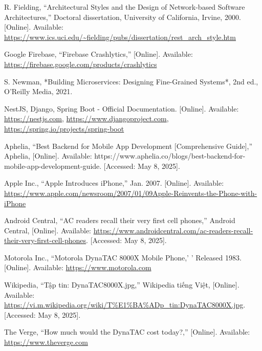 \documentclass[12pt]{report}
\begin{document}
\begin{thebibliography}{1}



  R. Fielding, “Architectural Styles and the Design of Network-based Software Architectures,” Doctoral dissertation, University of California, Irvine, 2000. [Online]. Available: \url{https://www.ics.uci.edu/~fielding/pubs/dissertation/rest_arch_style.htm}
  
  Google Firebase, “Firebase Crashlytics,” [Online]. Available: \url{https://firebase.google.com/products/crashlytics}
  
  S. Newman, *Building Microservices: Designing Fine-Grained Systems*, 2nd ed., O'Reilly Media, 2021.
  
  NestJS, Django, Spring Boot - Official Documentation. [Online]. Available: \url{https://nestjs.com}, \url{https://www.djangoproject.com}, \url{https://spring.io/projects/spring-boot}

  Aphelia, “Best Backend for Mobile App Development [Comprehensive Guide],” Aphelia, [Online]. Available: https://www.aphelia.co/blogs/best-backend-for-mobile-app-development-guide. [Accessed: May 8, 2025].


  Apple Inc., ``Apple Introduces iPhone,'' Jan. 2007. [Online]. Available: \url{https://www.apple.com/newsroom/2007/01/09Apple-Reinvents-the-Phone-with-iPhone}

  Android Central, “AC readers recall their very first cell phones,” Android Central, [Online]. Available: \url{https://www.androidcentral.com/ac-readers-recall-their-very-first-cell-phones}. [Accessed: May 8, 2025].


  Motorola Inc., ``Motorola DynaTAC 8000X Mobile Phone,'  ' Released 1983. [Online]. Available: \url{https://www.motorola.com}


  Wikipedia, “Tập tin: DynaTAC8000X.jpg,” Wikipedia tiếng Việt, [Online]. Available: \url{https://vi.m.wikipedia.org/wiki/T%E1%BA%ADp_tin:DynaTAC8000X.jpg}. [Accessed: May 8, 2025].


  The Verge, ``How much would the DynaTAC cost today?,'' [Online]. Available: \url{https://www.theverge.com}


\end{thebibliography}
\end{document}
